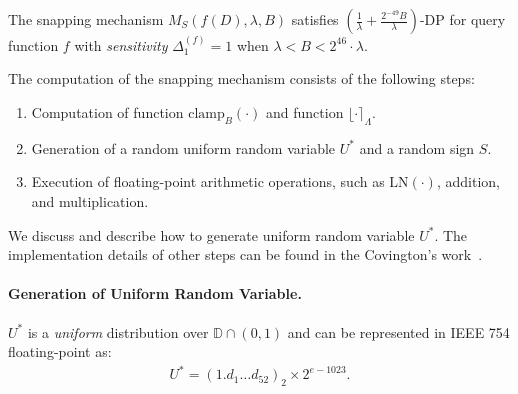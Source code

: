 \begin{theorem}
    The snapping mechanism $M_{S}\left(f\left(D\right),\lambda,B\right)$ satisfies $\left(\frac{1}{\lambda}+\frac{2^{-49}B}{\lambda}\right) $-DP for query function $f$ with \textit{sensitivity} $\Delta _1^{\left(f\right) } =1$ when $\lambda<B<2^{46}\cdot\lambda$.
\end{theorem}



The computation of the snapping mechanism consists of the following steps:
\begin{enumerate}
    \label{enu:snappingSteps}
    \item Computation of function $\text{clamp}_B\left(\cdot\right) $ and function $\lfloor \cdot\rceil_{\Lambda}$.
    \item Generation of a random uniform random variable $U^{*}$ and a random sign $S$.
    \item Execution of floating-point arithmetic operations, such as $\text{LN}\left(\cdot\right) $, addition, and multiplication.
\end{enumerate}
We discuss and describe how to generate uniform random variable $U^{*}$. The implementation details of other steps can be found in the Covington's work~\cite{Covington2019}.



\paragraph{Generation of Uniform Random Variable.}
$U^{*}$ is a \textit{uniform} distribution over $\mathbb{D} \cap \left(0,1\right) $ and can be represented in IEEE 754 floating-point as:
\begin{equation}
    \begin{split}
        U^{*}=\left(1.d_{1}\ldots d_{52}\right)_{2}\times2^{e-1023}.
    \end{split}
\end{equation}


